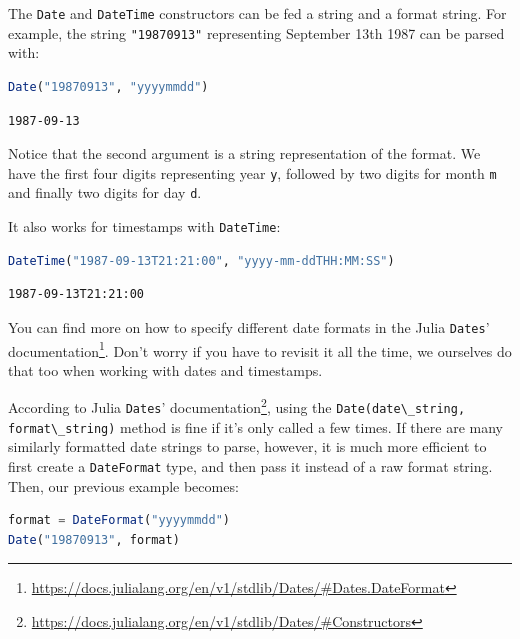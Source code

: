 \documentclass[
  notoc %
]{tufte-book}
\DeclareRobustCommand{\href}[2]{#2\footnote{\url{#1}}}
\newcommand{\passthrough}[1]{#1}
\begin{document}
The \passthrough{\lstinline!Date!} and
\passthrough{\lstinline!DateTime!} constructors can be fed a string and
a format string. For example, the string
\passthrough{\lstinline!"19870913"!} representing September 13th 1987
can be parsed with:

\begin{lstlisting}[language=Julia]
Date("19870913", "yyyymmdd")
\end{lstlisting}

\begin{lstlisting}[language=Output]
1987-09-13
\end{lstlisting}

Notice that the second argument is a string representation of the
format. We have the first four digits representing year
\passthrough{\lstinline!y!}, followed by two digits for month
\passthrough{\lstinline!m!} and finally two digits for day
\passthrough{\lstinline!d!}.

It also works for timestamps with \passthrough{\lstinline!DateTime!}:

\begin{lstlisting}[language=Julia]
DateTime("1987-09-13T21:21:00", "yyyy-mm-ddTHH:MM:SS")
\end{lstlisting}

\begin{lstlisting}[language=Output]
1987-09-13T21:21:00
\end{lstlisting}

You can find more on how to specify different date formats in the
\href{https://docs.julialang.org/en/v1/stdlib/Dates/\#Dates.DateFormat}{Julia
\passthrough{\lstinline!Dates!}' documentation}. Don't worry if you have
to revisit it all the time, we ourselves do that too when working with
dates and timestamps.

According to
\href{https://docs.julialang.org/en/v1/stdlib/Dates/\#Constructors}{Julia
\passthrough{\lstinline!Dates!}' documentation}, using the
\passthrough{\lstinline!Date(date\_string, format\_string)!} method is
fine if it's only called a few times. If there are many similarly
formatted date strings to parse, however, it is much more efficient to
first create a \passthrough{\lstinline!DateFormat!} type, and then pass
it instead of a raw format string. Then, our previous example becomes:

\begin{lstlisting}[language=Julia]
format = DateFormat("yyyymmdd")
Date("19870913", format)
\end{lstlisting}
\end{document}
